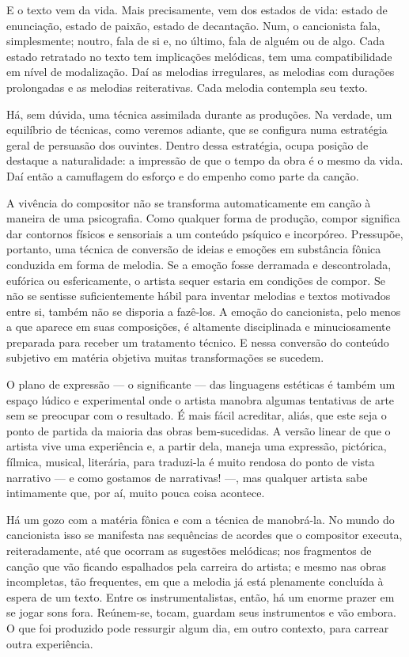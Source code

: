 E o texto vem da vida. Mais precisamente, vem dos estados de vida:
estado de enunciação, estado de paixão, estado de decantação. Num, o
cancionista fala, simplesmente; noutro, fala de si e, no último, fala de
alguém ou de algo. Cada estado retratado no texto tem implicações
melódicas, tem uma compatibilidade em nível de modalização. Daí as
melodias irregulares, as melodias com durações prolongadas e as melodias
reiterativas. Cada melodia contempla seu texto.

Há, sem dúvida, uma técnica assimilada durante as produções. Na verdade,
um equilíbrio de técnicas, como veremos adiante, que se configura numa
estratégia geral de persuasão dos ouvintes. Dentro dessa estratégia,
ocupa posição de destaque a naturalidade: a impressão de que o tempo da
obra é o mesmo da vida. Daí então a camuflagem do esforço e do empenho
como parte da canção.

A vivência do compositor não se transforma automaticamente em canção à
maneira de uma psicografia. Como qualquer forma de produção, compor
significa dar contornos físicos e sensoriais a um conteúdo psíquico e
incorpóreo. Pressupõe, portanto, uma técnica de conversão de ideias e
emoções em substância fônica conduzida em forma de melodia. Se a emoção
fosse derramada e descontrolada, eufórica ou esfericamente, o artista
sequer estaria em condições de compor. Se não se sentisse
suficientemente hábil para inventar melodias e textos motivados entre
si, também não se disporia a fazê-los. A emoção do cancionista, pelo
menos a que aparece em suas composições, é altamente disciplinada e
minuciosamente preparada para receber um tratamento técnico. E nessa
conversão do conteúdo subjetivo em matéria objetiva muitas
transformações se sucedem.

O plano de expressão --- o significante --- das linguagens estéticas é também
um espaço lúdico e experimental onde o artista manobra algumas
tentativas de arte sem se preocupar com o resultado. É mais fácil
acreditar, aliás, que este seja o ponto de partida da maioria das obras
bem-sucedidas. A versão linear de que o artista vive uma experiência e,
a partir dela, maneja uma expressão, pictórica, fílmica, musical,
literária, para traduzi-la é muito rendosa do ponto de vista narrativo
 --- e como gostamos de narrativas! ---, mas qualquer artista sabe intimamente
que, por aí, muito pouca coisa acontece.

Há um gozo com a matéria fônica e com a técnica de manobrá-la. No mundo
do cancionista isso se manifesta nas sequências de acordes que o
compositor executa, reiteradamente, até que ocorram as sugestões
melódicas; nos fragmentos de canção que vão ficando espalhados pela
carreira do artista; e mesmo nas obras incompletas, tão frequentes, em
que a melodia já está plenamente concluída à espera de um texto. Entre
os instrumentalistas, então, há um enorme prazer em se jogar sons fora.
Reúnem-se, tocam, guardam seus instrumentos e vão embora. O que foi
produzido pode ressurgir algum dia, em outro contexto, para carrear
outra experiência.

